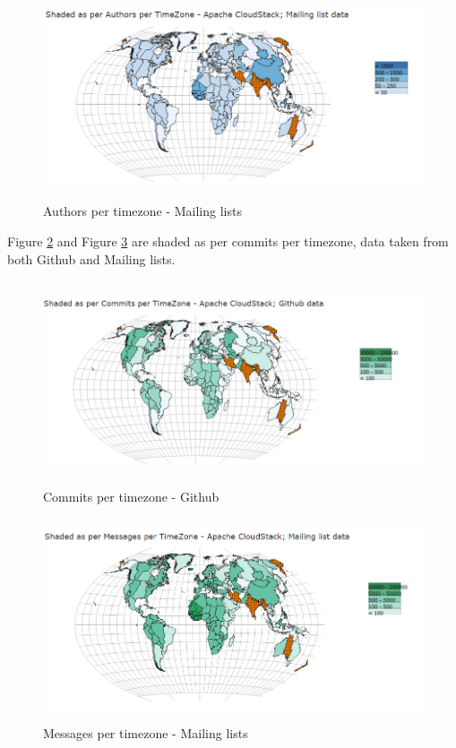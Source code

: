 \documentclass[seploa]{beavtex}
\begin{document}
\begin{figure}[H]
\centering
\includegraphics[width=130mm,height=60mm]{image5.PNG}
\caption{Authors per timezone - Mailing lists}
\label{fig:auML}
\end{figure}

Figure \ref{fig:coHub} and Figure \ref{fig:mgML} are shaded as per commits per timezone, data taken from both Github and Mailing lists.

\begin{figure}[H]
\centering
\includegraphics[width=130mm,height=60mm]{image6.PNG}
\caption{Commits per timezone - Github}
\label{fig:coHub}
\end{figure}

\begin{figure}[H]
\centering
\includegraphics[width=130mm,height=60mm]{image7.PNG}
\caption{Messages per timezone - Mailing lists}
\label{fig:mgML}
\end{figure}
\end{document}
